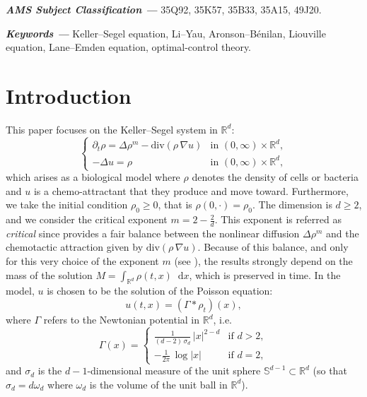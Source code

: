 \documentclass[11pt,a4paper]{article}
\newcommand{\subjectPDF}{%
    35Q92,  	%
    35K57, %
    35B33, %
    35A15, %
    49J20. %
}
\newcommand{\keywordsPDF}{%
    Keller--Segel equation, Li--Yau, Aronson--Bénilan, Liouville equation, Lane--Emden equation, optimal-control theory.
}
\newcommand{\subjectclassification}[1]{

	{\small\textbf{\textit{AMS Subject Classification --- }} #1}

}
\newcommand{\keywords}[1]{

	{\small\textbf{\textit{Keywords --- }} #1}

}
\numberwithin{equation}{section}
\newcommand{\R}{{\mathbb{R}}}
\theoremstyle{plain}
\theoremstyle{remark}
\newcommand {\f}{\frac}
\newcommand{\diff}{\mathop{}\!\mathrm{d}}
\begin{document}
\subjectclassification{\subjectPDF}
\keywords{\keywordsPDF}


\newpage

\tableofcontents


\section{Introduction}


This paper focuses on the Keller--Segel system in $\mathbb{R}^d$:
\begin{equation}\label{eq:KS}\tag{KS}
\begin{cases}
\displaystyle\partial_t\rho   = \Delta \rho^m  -  \mathrm{div}\left(\rho \,\nabla u \right) 
& \text{in } (0,\infty) \times \mathbb{R}^d,\\[6pt]
-\Delta u  =  \rho 
& \text{in } (0,\infty)\times \mathbb{R}^d,
\end{cases}
\end{equation}
which arises as a biological model where $\rho$ denotes the density of cells or bacteria and $u$ is a chemo-attractant that they produce and move toward. Furthermore, we take the initial condition $\rho_{0}\ge 0$, that is $\rho(0,\cdot)=\rho_{0}$. The dimension is $d\ge 2$, and we  consider the critical exponent $m = 2 - \frac{2}{d}$. This exponent is referred as \textit{critical} since provides a fair balance between the nonlinear diffusion $\Delta\rho^m$ and the chemotactic attraction given by $\mathrm{div}(\rho\,\nabla u)$. Because of this balance, and only for this very choice of the exponent $m$ (see \cite{Carrillo_Craig_Yao19}), the results strongly depend on the mass of the solution $M=\int_{\R^d}\rho(t,x)\diff x$, which is preserved in time. In the model, $u$ is chosen to be the solution of the Poisson equation:
\[
u(t,x)  =  (\Gamma\ast\rho_t)(x),
\]
where $\Gamma$ refers to the Newtonian potential in $\mathbb{R}^d$, i.e.
\[
\Gamma(x)  = 
\begin{cases}
  \displaystyle \f{1}{(d-2)\,\sigma_d}\,|x|^{2-d} & \text{if } d > 2, \\
  \displaystyle -\f{1}{2\pi}\,\log|x| & \text{if } d = 2,
\end{cases}
\]
and $\sigma_d$ is the $d-1$-dimensional measure of the unit sphere $\mathbb{S}^{d-1}\subset \mathbb{R}^d$ (so that $\sigma_d=d\omega_d$ where  $\omega_d$ is the volume of the unit ball in $\R^d$).  
\end{document}
